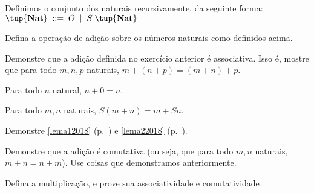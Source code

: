 \begin{definition}[Naturais]
Definimos o conjunto dos naturais recursivamente, da seguinte forma:
 $ \tup{\textbf{Nat}} \;::=\; O \;\; \vert \;\; S \; \tup{\textbf{Nat}} $
\end{definition}

\begin{exercise}
Defina a operação de adição sobre os números naturais como definidos acima.
\end{exercise}

\begin{exercise}
Demonstre que a adição definida no exercício anterior é associativa.
Isso é, mostre que para todo $m, n, p$ naturais, $m + (n + p) = (m + n) + p$.
\end{exercise}

\begin{definition}
	\label{lema12018}
	Para todo $n$ natural, $n + 0 = n$.
\end{definition}

\begin{definition}
	\label{lema22018}
	Para todo $m, n$ naturais, $S(m + n) = m + Sn$.
\end{definition}

\begin{homework}
Demonstre \ref{lema12018} (p.~\pageref{lema12018}) e \ref{lema22018} (p.~\pageref{lema22018}).
\end{homework}

\begin{exercise}
Demonstre que a adição é comutativa (ou seja, que para todo $m, n$ naturais, $m + n = n + m$).
Use coisas que demonstramos anteriormente.
\end{exercise}

\begin{homework}
Defina a multiplicação, e prove sua associatividade e comutatividade
\end{homework}
